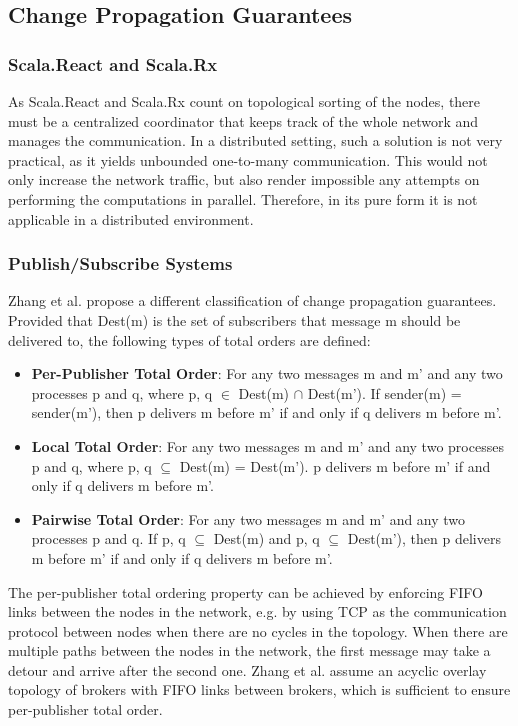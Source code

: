 \documentclass{sigplanconf}
\begin{document}
\subsection{Change Propagation Guarantees}
\subsubsection{Scala.React and Scala.Rx}
As Scala.React and Scala.Rx count on topological sorting of the nodes, there must be a centralized coordinator that keeps track of the whole network and manages the communication. In a distributed setting, such a solution is not very practical, as it yields unbounded one-to-many communication. This would not only increase the network traffic, but also render impossible any attempts on performing the computations in parallel. Therefore, in its pure form it is not applicable in a distributed environment.

\subsubsection{Publish/Subscribe Systems}
Zhang et al. \cite{totalorder} propose a different classification of change propagation guarantees. Provided that Dest(m) is the set of subscribers that message m should be delivered to, the following types of total orders are defined:

\begin{itemize} \itemsep1pt \parskip0pt 
  \item \textbf{Per-Publisher Total Order}: For any two messages m and m' and any two processes p and q, where {p, q} $\in$ Dest(m) $\cap$ Dest(m'). If sender(m) = sender(m'), then p delivers m before m' if and only if q delivers m before m'.

  \item \textbf{Local Total Order}: For any two messages m and m' and any two processes p and q, where {p, q} $\subseteq$ Dest(m) = Dest(m'). p delivers m before m' if and only if q delivers m before m'.

  \item \textbf{Pairwise Total Order}: For any two messages m and m' and any two processes p and q. If {p, q} $\subseteq$ Dest(m) and {p, q} $\subseteq$ Dest(m'), then p delivers m before m' if and only if q delivers m before m'.

\end{itemize}

The per-publisher total ordering property can be achieved by enforcing FIFO links between the nodes in the network, e.g. by using TCP as the communication protocol between nodes when there are no cycles in the topology. When there are multiple paths between the nodes in the network, the first message may take a detour and arrive after the second one. Zhang et al.\cite{totalorder} assume an acyclic overlay topology of brokers with FIFO links between brokers, which is sufficient to ensure per-publisher total order.
\end{document}
